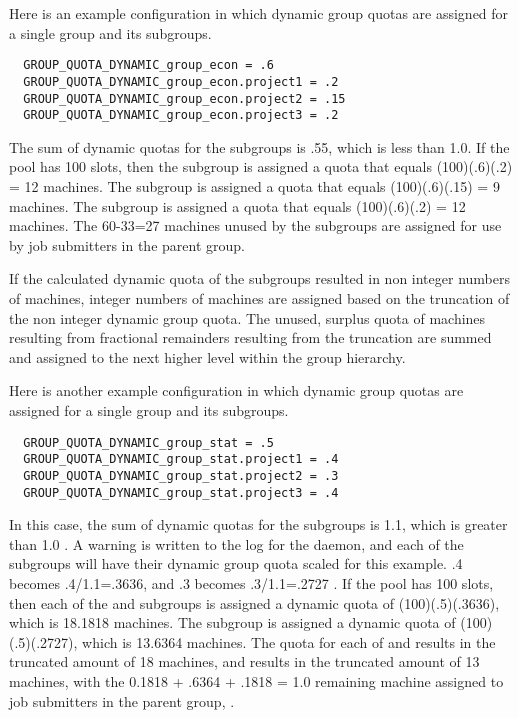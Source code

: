 \begin{description}
Here is an example configuration in which dynamic group quotas are assigned for
a single group and its subgroups.
\begin{verbatim}
  GROUP_QUOTA_DYNAMIC_group_econ = .6
  GROUP_QUOTA_DYNAMIC_group_econ.project1 = .2
  GROUP_QUOTA_DYNAMIC_group_econ.project2 = .15
  GROUP_QUOTA_DYNAMIC_group_econ.project3 = .2
\end{verbatim}
The sum of dynamic quotas for the subgroups is .55, 
which is less than 1.0.
If the pool has 100 slots, 
then the  subgroup is assigned a quota that
equals (100)(.6)(.2) = 12 machines. 
The  subgroup is assigned a quota that
equals (100)(.6)(.15) = 9 machines. 
The  subgroup is assigned a quota that
equals (100)(.6)(.2) = 12 machines. 
The 60-33=27 machines unused by the subgroups are assigned
for use by job submitters in the parent  group.

If the calculated dynamic quota of the subgroups resulted in non integer
numbers of machines,
integer numbers of machines are assigned based on the truncation of the
non integer dynamic group quota.
The unused, surplus quota of machines resulting from
fractional remainders resulting from the truncation are summed
and assigned to the next higher level within the group hierarchy.

Here is another example configuration in which dynamic group quotas 
are assigned for a single group and its subgroups.
\begin{verbatim}
  GROUP_QUOTA_DYNAMIC_group_stat = .5
  GROUP_QUOTA_DYNAMIC_group_stat.project1 = .4
  GROUP_QUOTA_DYNAMIC_group_stat.project2 = .3
  GROUP_QUOTA_DYNAMIC_group_stat.project3 = .4
\end{verbatim}
In this case, the sum of dynamic quotas for the subgroups is 1.1, 
which is greater than 1.0 .
A warning is written to the log for the  daemon,
and each of the subgroups will have their dynamic group quota scaled
for this example.
.4 becomes .4/1.1=.3636,
and .3 becomes .3/1.1=.2727 .
If the pool has 100 slots, 
then each of the  and  subgroups 
is assigned a dynamic quota of
(100)(.5)(.3636), which is 18.1818 machines. 
The  subgroup is assigned a dynamic quota of
(100)(.5)(.2727), which is 13.6364 machines. 
The quota for each of  and  results 
in the truncated amount of 18 machines,
and  results in the truncated amount of 13 machines,
with the 0.1818 + .6364 + .1818 = 1.0 remaining machine assigned to
job submitters in the parent group, . 

\end{description}

